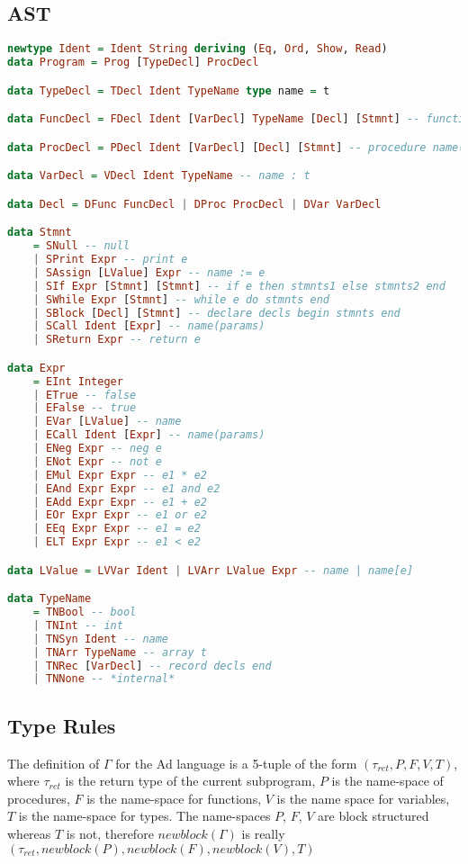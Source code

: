 \subsection{AST}
\begin{lstlisting}[language=Haskell]
newtype Ident = Ident String deriving (Eq, Ord, Show, Read)
data Program = Prog [TypeDecl] ProcDecl

data TypeDecl = TDecl Ident TypeName type name = t

data FuncDecl = FDecl Ident [VarDecl] TypeName [Decl] [Stmnt] -- function name(params) return t decls being stmnts end

data ProcDecl = PDecl Ident [VarDecl] [Decl] [Stmnt] -- procedure name(params) decls being stmnts end 

data VarDecl = VDecl Ident TypeName -- name : t

data Decl = DFunc FuncDecl | DProc ProcDecl | DVar VarDecl

data Stmnt
    = SNull -- null
    | SPrint Expr -- print e
    | SAssign [LValue] Expr -- name := e
    | SIf Expr [Stmnt] [Stmnt] -- if e then stmnts1 else stmnts2 end
    | SWhile Expr [Stmnt] -- while e do stmnts end
    | SBlock [Decl] [Stmnt] -- declare decls begin stmnts end 
    | SCall Ident [Expr] -- name(params)
    | SReturn Expr -- return e

data Expr
    = EInt Integer
    | ETrue -- false
    | EFalse -- true
    | EVar [LValue] -- name
    | ECall Ident [Expr] -- name(params)
    | ENeg Expr -- neg e
    | ENot Expr -- not e
    | EMul Expr Expr -- e1 * e2
    | EAnd Expr Expr -- e1 and e2
    | EAdd Expr Expr -- e1 + e2
    | EOr Expr Expr -- e1 or e2
    | EEq Expr Expr -- e1 = e2
    | ELT Expr Expr -- e1 < e2

data LValue = LVVar Ident | LVArr LValue Expr -- name | name[e]

data TypeName
    = TNBool -- bool
    | TNInt -- int
    | TNSyn Ident -- name
    | TNArr TypeName -- array t
    | TNRec [VarDecl] -- record decls end
    | TNNone -- *internal*   
\end{lstlisting}

\subsection{Type Rules}
The definition of $\Gamma$ for the Ad language is a 5-tuple of the form $(\tau_{ret}, P, F, V, T)$, where $\tau_{ret}$ is the return type of the current subprogram, $P$ is the name-space of procedures, $F$ is the name-space for functions, $V$ is the name space for variables, $T$ is the name-space for types.
The name-spaces $P$, $F$, $V$ are block structured whereas $T$ is not, therefore $newblock(\Gamma)$ is really $(\tau_{ret}, newblock(P),newblock(F), newblock(V), T)$
